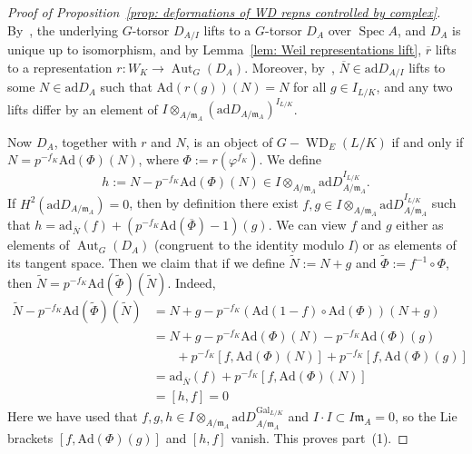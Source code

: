 \documentclass{amsart}
\def\Ad{\mathrm{Ad}}
\def\ad{\mathrm{ad}}
\theoremstyle{definition}
\theoremstyle{remark}
\newtheorem{remark}[subsubsection]{Remark}
\newcommand{\mar}[1]{}
\newcommand{\mar}[1]{\marginpar{\raggedright\tiny squirrel #1}}
\DeclareMathOperator{\Aut}{Aut}
\DeclareMathOperator{\Gal}{Gal}
\DeclareMathOperator{\Spec}{Spec}
\DeclareMathOperator{\WD}{WD}
\begin{document}

\begin{proof}[Proof of Proposition~\ref{prop: deformations of WD repns controlled by complex}]
By~\cite[Lemma 3.4]{2014arXiv1403.1411B}, the underlying $G$-torsor
$D_{A/I}$ lifts to a $G$-torsor $D_A$ over $\Spec A$, and $D_A$ is
unique up to isomorphism, and by Lemma~\ref{lem: Weil representations lift}, $\overline r$ lifts to a representation $r:W_K\rightarrow \Aut_G(D_A)$.  Moreover, by~\cite[Lemma 3.7]{2014arXiv1403.1411B}, $\overline N\in\ad D_{A/I}$ lifts to some $N\in\ad D_A$ such that $\Ad(r(g))(N)=N$ for all $g\in I_{L/K}$, and any two lifts differ by an element of $I\otimes_{A/\mathfrak{m}_A}(\ad D_{A/\mathfrak{m}_A})^{I_{L/K}}$.

Now $D_A$, together with $r$ and $N$, is an object of $G-\WD_E(L/K)$ if and only if $N=p^{-f_K}\Ad(\Phi)(N)$, where $\Phi:=r(\varphi^{f_K})$.  We define \[h:=N-p^{-f_K}\Ad(\Phi)(N)\in I\otimes_{A/\mathfrak{m}_A}\ad D_{A/\mathfrak{m}_A}^{I_{L/K}}.\]  If $H^2(\ad D_{A/\mathfrak{m}_A})=0$, then by definition there exist $f,g\in I\otimes_{A/\mathfrak{m}_A}\ad D_{A/\mathfrak{m}_A}^{I_{L/K}}$ such that $h=\ad_{\overline N}(f)+(p^{-f_K}\Ad(\overline\Phi)-1)(g)$.  We can view $f$ and $g$ either as elements of $\Aut_G(D_A)$ (congruent to the identity modulo $I$) or as elements of its tangent space.  Then we claim that if we define $\widetilde N:=N+g$ and $\widetilde\Phi:=f^{-1}\circ\Phi$, then $\widetilde{N}=p^{-f_K}\Ad(\widetilde{\Phi})(\widetilde{N})$.  Indeed,
\begin{align*}
\widetilde{N}-p^{-f_K}\Ad(\widetilde{\Phi})(\widetilde{N})&=N+g-p^{-f_K}(\Ad(1-f)\circ\Ad(\Phi))(N+g) 	\\
&=N+g-p^{-f_K} \Ad(\Phi)(N)-p^{-f_K}\Ad(\Phi)(g)\\ &\phantom{{}=1}+p^{-f_K}[f,\Ad(\Phi)(N)]+p^{-f_K}[f,\Ad(\Phi)(g)]	\\
&=\ad_{\overline N}(f)+p^{-f_K}[f,\Ad(\Phi)(N)]	\\
&=[h,f]=0
\end{align*}
Here we have used that $f,g,h\in I\otimes_{A/\mathfrak{m}_A}\ad
D_{A/\mathfrak{m}_A}^{\Gal_{L/K}}$ and $I\cdot I\subset
I\mathfrak{m}_A=0$, so the Lie brackets $[f,\Ad(\Phi)(g)]$ and $[h,f]$
vanish. This proves part~(1).


\end{proof}
\end{document}
